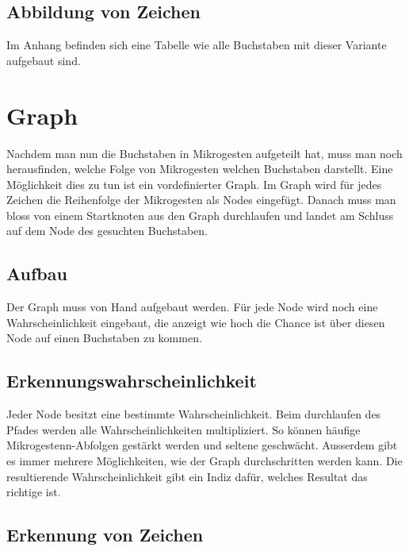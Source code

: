\section{Abbildung von Zeichen}

Im Anhang befinden sich eine Tabelle wie alle Buchstaben mit dieser Variante aufgebaut sind.

\chapter{Graph}
Nachdem man nun die Buchstaben in Mikrogesten aufgeteilt hat, muss man noch herausfinden, welche Folge von Mikrogesten welchen Buchstaben darstellt. Eine Möglichkeit dies zu tun ist ein vordefinierter Graph. Im Graph wird für jedes Zeichen die Reihenfolge der Mikrogesten als Nodes eingefügt. Danach muss man bloss von einem Startknoten aus den Graph durchlaufen und landet am Schluss auf dem Node des gesuchten Buchstaben.


\section{Aufbau}
Der Graph muss von Hand aufgebaut werden. Für jede Node wird noch eine Wahrscheinlichkeit eingebaut, die anzeigt wie hoch die Chance ist über diesen Node auf einen Buchstaben zu kommen.

\section{Erkennungswahrscheinlichkeit}
Jeder Node besitzt eine bestimmte Wahrscheinlichkeit. Beim durchlaufen des Pfades werden alle Wahrscheinlichkeiten multipliziert. So können häufige Mikrogestenn-Abfolgen gestärkt werden und seltene geschwächt. Ausserdem gibt es immer mehrere Möglichkeiten, wie der Graph durchschritten werden kann. Die resultierende Wahrscheinlichkeit gibt ein Indiz dafür, welches Resultat das richtige ist.

\section{Erkennung von Zeichen}